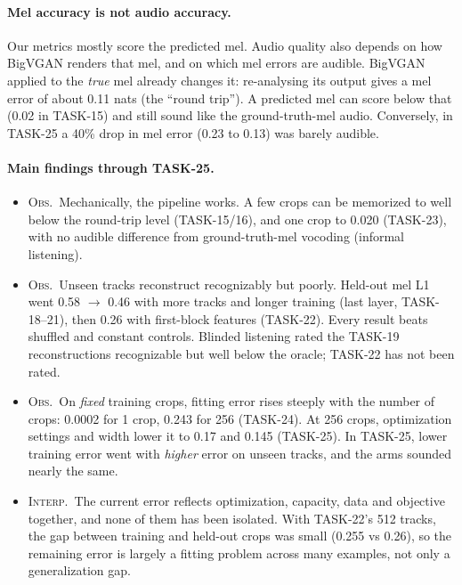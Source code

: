 \documentclass[10pt,letterpaper]{article}
\newcommand{\obs}{\textsc{Obs.}}
\newcommand{\interp}{\textsc{Interp.}}
\begin{document}
\paragraph{Mel accuracy is not audio accuracy.} Our metrics mostly score the predicted mel. Audio quality also depends on how BigVGAN renders that mel, and on which mel errors are audible. BigVGAN applied to the \emph{true} mel already changes it: re-analysing its output gives a mel error of about 0.11 nats (the ``round trip''). A predicted mel can score below that (0.02 in TASK-15) and still sound like the ground-truth-mel audio. Conversely, in TASK-25 a 40\% drop in mel error (0.23 to 0.13) was barely audible.

\paragraph{Main findings through TASK-25.}
\begin{itemize}
\item \obs\ Mechanically, the pipeline works. A few crops can be memorized to well below the round-trip level (TASK-15/16), and one crop to 0.020 (TASK-23), with no audible difference from ground-truth-mel vocoding (informal listening).
\item \obs\ Unseen tracks reconstruct recognizably but poorly. Held-out mel L1 went 0.58 $\to$ 0.46 with more tracks and longer training (last layer, TASK-18--21), then 0.26 with first-block features (TASK-22). Every result beats shuffled and constant controls. Blinded listening rated the TASK-19 reconstructions recognizable but well below the oracle; TASK-22 has not been rated.
\item \obs\ On \emph{fixed} training crops, fitting error rises steeply with the number of crops: 0.0002 for 1 crop, 0.243 for 256 (TASK-24). At 256 crops, optimization settings and width lower it to 0.17 and 0.145 (TASK-25). In TASK-25, lower training error went with \emph{higher} error on unseen tracks, and the arms sounded nearly the same.
\item \interp\ The current error reflects optimization, capacity, data and objective together, and none of them has been isolated. With TASK-22's 512 tracks, the gap between training and held-out crops was small (0.255 vs 0.26), so the remaining error is largely a fitting problem across many examples, not only a generalization gap.
\end{itemize}
\end{document}
